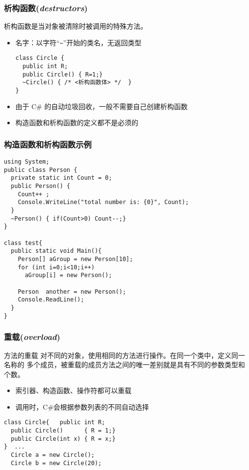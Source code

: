 \begin{frame}[fragile]
\frametitle{析构函数(\textit{destructors})}
析构函数是当对象被清除时被调用的特殊方法。
\begin{itemize}
\item 名字：以字符“\verb|~|”开始的类名，无返回类型
\begin{lstlisting}[escapeinside=<>]
class Circle {
  public int R;
  public Circle() { R=1;}
  ~Circle() { /* <析构函数体> */  }
}
\end{lstlisting}
\item 由于 C\# 的自动垃圾回收，一般不需要自己创建析构函数
\item 构造函数和析构函数的定义都不是必须的
\end{itemize}
\end{frame}

\begin{frame}
\frametitle{构造函数和析构函数示例}
\begin{lstlisting}
using System;
public class Person {
  private static int Count = 0;
  public Person() {
    Count++ ;
    Console.WriteLine("total number is: {0}", Count);
  }
  ~Person() { if(Count>0) Count--;}
}

class test{
  public static void Main(){
    Person[] aGroup = new Person[10];
    for (int i=0;i<10;i++)
      aGroup[i] = new Person();

    Person  another = new Person();
    Console.ReadLine();
  }
}

\end{lstlisting}
\end{frame}


\begin{frame}[fragile]
\frametitle{重载(\textit{overload})}
\begin{block}{方法的重载}
  \CJKindent 对不同的对象，使用相同的方法进行操作。在同一个类中，定义同一名称的
  多个成员，被重载的成员方法之间的唯一差别就是具有不同的参数类型和个数。
\end{block}
\begin{itemize}
\item 索引器、构造函数、操作符都可以重载
\item 调用时，C\#会根据参数列表的不同自动选择
\end{itemize}
\begin{lstlisting}[escapeinside=<>]
class Circle{   public int R;
  public Circle()      { R = 1;}
  public Circle(int x) { R = x;}
}  ...
  Circle a = new Circle();
  Circle b = new Circle(20);
\end{lstlisting}
\end{frame}

